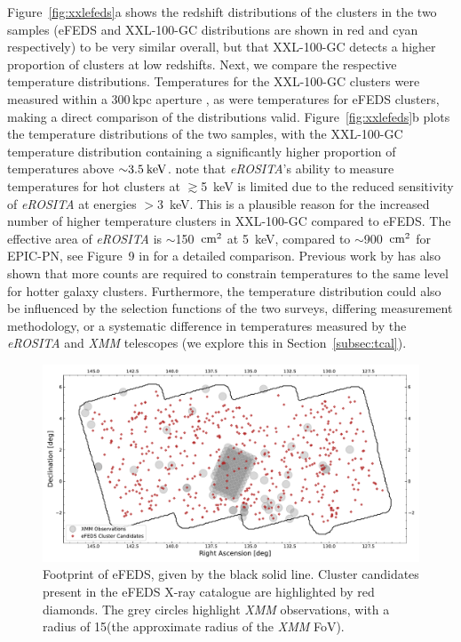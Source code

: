 \documentclass[fleqn,usenatbib]{mnras}
\begin{document}
Figure~\ref{fig:xxlefeds}a shows the redshift distributions of the clusters in the two samples (eFEDS and XXL-100-GC distributions are shown in red and cyan respectively) to be very similar overall, but that XXL-100-GC detects a higher proportion of clusters at low redshifts.  Next, we compare the respective temperature distributions. Temperatures for the XXL-100-GC clusters were measured within a 300\,kpc aperture \citep{xxllt}, as were temperatures for eFEDS clusters, making a direct comparison of the distributions valid. Figure~\ref{fig:xxlefeds}b plots the temperature distributions of the two samples, with the XXL-100-GC temperature distribution containing a significantly higher proportion of temperatures above ${\sim}3.5\:\rm{keV}$. \cite{efedsclustercat} note that {\em eROSITA}'s ability to measure temperatures for hot clusters at $\gtrsim$5~keV is limited due to the reduced sensitivity of {\em eROSITA} at energies $>$3~keV. This is a plausible reason for the increased number of higher temperature clusters in XXL-100-GC compared to eFEDS. The effective area of {\em eROSITA} is ${\sim}$150~$\rm{cm}^2$ at 5~keV, compared to ${\sim}$900~$\rm{cm}^2$ for EPIC-PN, see Figure~9 in \cite{missionpaper} for a detailed comparison. Previous work by \cite{xcsmethod} has also shown that more counts are required to constrain temperatures to the same level for hotter galaxy clusters. Furthermore, the temperature distribution could also be influenced by the selection functions of the two surveys, differing measurement methodology, or a systematic difference in temperatures measured by the {\em eROSITA} and {\em XMM} telescopes (we explore this in Section~\ref{subsec:tcal}). 

\begin{figure}
    \centering
    \includegraphics[width=1.0\textwidth]{images/efeds_outline_xmm_pointings.pdf}
    \caption[]{Footprint of eFEDS, given by the black solid line. Cluster candidates present in the eFEDS X-ray catalogue are highlighted by red diamonds. The grey circles highlight {\em XMM} observations, with a radius of 15\arcmin (the approximate radius of the {\em XMM} FoV).}
    \label{fig:efedsxcsclusters}
\end{figure}
\end{document}
